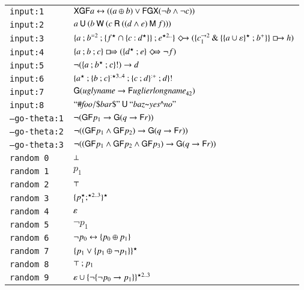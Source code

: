\documentclass{article}
\begin{document}
\begin{tabular}{ll}
\texttt{input:1} & $\mathsf{X} \mathsf{G} \mathsf{F} a \leftrightarrow ((a \oplus b) \lor \mathsf{F} \mathsf{G} \mathsf{X} (\lnot b \land \lnot c))$ \\
\texttt{input:2} & $a \mathbin{\mathsf{U}} (b \mathbin{\mathsf{W}} (c \mathbin{\mathsf{R}} ((d \land e) \mathbin{\mathsf{M}} f)))$ \\
\texttt{input:3} & $\{a \SereConcat b\SereEqual{2} \SereConcat \{f\SereStar{} \SereAnd \{c \SereFusion d\SereStar{}\}\} \SereConcat e\SereStar{2..}\}\seq (\{c_{1}\SereGoto{2} \SereAndNLM \{\{a \SereOr \eword\}\SereStar{} \SereConcat b\SerePlus{}\}\}\triggers h)$ \\
\texttt{input:4} & $\{a \SereConcat b \SereConcat c\}\triggersX (\{d\SereStar{} \SereConcat e\}\seqX \lnot f)$ \\
\texttt{input:5} & $\lnot (\{a \mathbin{\mathsf{;}} b^{\star} \mathbin{\mathsf{;}} c\}!) \rightarrow d$ \\
\texttt{input:6} & $\{a^{\star} \mathbin{\mathsf{;}} \{b \mathbin{\mathsf{;}} c\}^{\mathsf{:}\star3..4} \mathbin{\mathsf{;}} \{c \mathbin{\mathsf{;}} d\}^{\mathsf{:}+}{} \mathbin{\mathsf{;}} d\}!$ \\
\texttt{input:7} & $\mathsf{G} (\mathit{uglyname} \rightarrow \mathsf{F} \mathit{uglierlongname}_{42})$ \\
\texttt{input:8} & $``\mathit{\#foo/\$bar\$}\textrm{''} \mathbin{\mathsf{U}} ``\mathit{baz\text{\textasciitilde}yes\text{\textasciicircum}no}\textrm{''}$ \\
\texttt{--go-theta:1} & $\lnot (\mathsf{G} \mathsf{F} p_{1} \rightarrow \mathsf{G} (q \rightarrow \mathsf{F} r))$ \\
\texttt{--go-theta:2} & $\lnot ((\mathsf{G} \mathsf{F} p_{1} \land \mathsf{G} \mathsf{F} p_{2}) \rightarrow \mathsf{G} (q \rightarrow \mathsf{F} r))$ \\
\texttt{--go-theta:3} & $\lnot ((\mathsf{G} \mathsf{F} p_{1} \land \mathsf{G} \mathsf{F} p_{2} \land \mathsf{G} \mathsf{F} p_{3}) \rightarrow \mathsf{G} (q \rightarrow \mathsf{F} r))$ \\
\texttt{random 0} & $\bot$ \\
\texttt{random 1} & $p_{1}$ \\
\texttt{random 2} & $\top$ \\
\texttt{random 3} & $\{p_{1}^{\star} \mathbin{\mathsf{;}} ^{\star2..3}\}^{\star}$ \\
\texttt{random 4} & $\varepsilon$ \\
\texttt{random 5} & $\lnot p_{1}$ \\
\texttt{random 6} & $\lnot p_{0} \leftrightarrow \{p_{0} \oplus p_{1}\}$ \\
\texttt{random 7} & $\{p_{1} \lor \{p_{1} \oplus \lnot p_{1}\}\}^{\star}$ \\
\texttt{random 8} & $\top \mathbin{\mathsf{;}} p_{1}$ \\
\texttt{random 9} & $\varepsilon \cup \{\lnot \{\lnot p_{0} \rightarrow p_{1}\}\}^{\star2..3}$ \\
\end{tabular}
\end{document}
